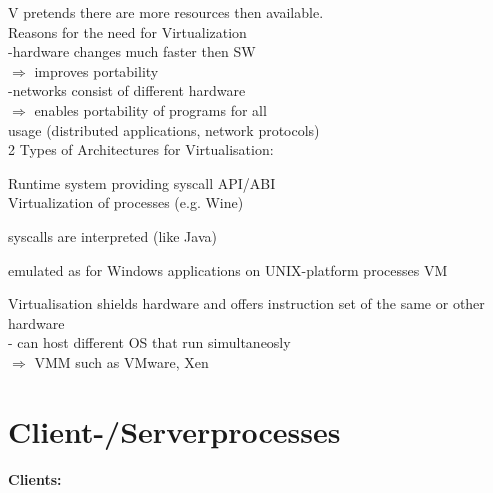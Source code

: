V pretends there are more resources then available.\\

Reasons for the need for Virtualization\\
-hardware changes much faster then SW\\
$\Rightarrow$ improves portability\\
-networks consist of different hardware\\
$\Rightarrow$ enables portability of programs for all\\
usage (distributed applications, network protocols)\\

2 Types of Architectures for Virtualisation:\\
\begin{compactenum}
\item Runtime system providing syscall API/ABI\\
    Virtualization of processes (e.g. Wine)\\
	\begin{compactitem}
    \item syscalls are interpreted (like Java)
	\item emulated as for Windows applications on UNIX-platform processes VM
	\end{compactitem}
\item Virtualisation shields hardware and offers instruction set of the same or other hardware\\
- can host different OS that run simultaneosly\\
$\Rightarrow$ VMM such as VMware, Xen\\


\end{compactenum}


\section{Client-/Serverprocesses}
\textbf{Clients:}\\

